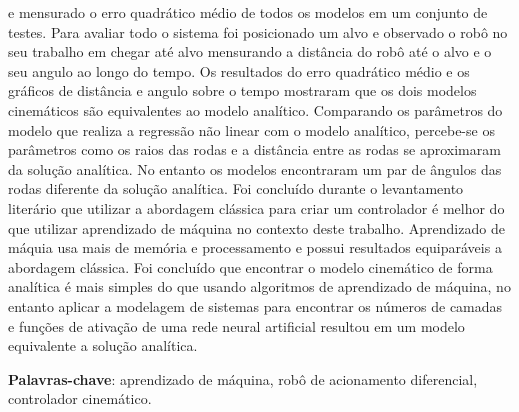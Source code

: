 e mensurado o erro quadrático
médio de todos os modelos em um conjunto de testes.
Para avaliar todo o sistema foi posicionado um alvo e observado o robô no 
seu trabalho em chegar até alvo mensurando a distância do robô até o
alvo e o seu angulo ao longo do tempo. Os resultados do erro quadrático médio e os
gráficos de distância e angulo sobre o tempo 
mostraram que os dois modelos cinemáticos são equivalentes ao modelo
analítico. Comparando os parâmetros do modelo que realiza a
regressão não linear com o modelo analítico,
percebe-se os parâmetros como os raios das rodas e a distância entre as rodas
se aproximaram da solução analítica. No entanto os modelos encontraram um
par de ângulos das rodas diferente da solução analítica.
Foi concluído durante o levantamento literário que
utilizar a abordagem clássica para criar um controlador é melhor do que
utilizar aprendizado de máquina no contexto deste trabalho. Aprendizado de máquia usa mais de memória e
processamento  e possui resultados equiparáveis a abordagem clássica.
Foi concluído que encontrar o modelo cinemático de forma analítica é mais
simples do que usando algoritmos de aprendizado
de máquina, no entanto aplicar a modelagem  de sistemas para encontrar
os números de camadas e funções de ativação de uma rede neural artificial
resultou em um modelo equivalente
a solução analítica.




\vspace{1.5ex}

{\bf Palavras-chave}: aprendizado de máquina, robô de acionamento diferencial,
controlador cinemático.

%
%

